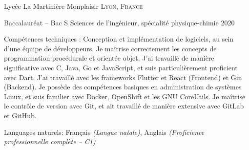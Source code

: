\documentclass[10pt,a4paper]{article} %
\begin{document}

\headedsection %
{Lycée La Martinière Monplaisir}
{\textsc{Lyon, France}} {

\headedsubsection %
{Baccalauréat -- Bac S Sciences de l'ingénieur, spécialité physique-chimie}
{2020} {}
}

\spacedhrule{0.5em}{-0.4em} %



\inlineheadsection %
{Compétences techniques :}
{Conception et implémentation de logiciels, au sein d'une équipe de développeurs. Je maîtrise correctement les concepts de programmation procédurale et orientée objet. J'ai travaillé de manière significative avec C, Java, Go et JavaScript, et suis particulièrement proficient avec Dart. J'ai travaillé avec les frameworks Flutter et React (Frontend) et Gin (Backend). Je possède des compétences basiques en administration de systèmes Linux, et suis familier avec Docker, OpenShift et les GNU CoreUtils. Je maîtrise le contrôle de version avec Git, et ait travaillé de manière extensive avec GitLab et GitHub. }



\inlineheadsection %
{Languages naturels:}
{Français \textit{(Langue natale)}, Anglais \textit{(Proficience professionnelle complète -- C1)}}
\end{document}
